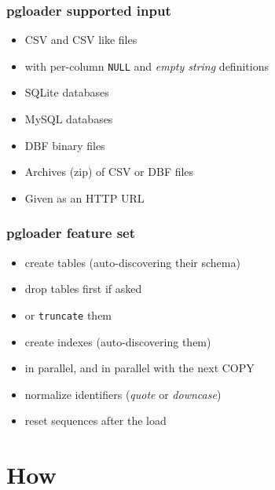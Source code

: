 \documentclass{beamer}
\begin{document}
\begin{frame}[fragile]
  \frametitle{pgloader supported input}
  
  \vfill

  \begin{itemize}
  \item CSV and CSV like files
  \item with per-column \texttt{NULL} and \textit{empty string} definitions
  \item SQLite databases
  \item MySQL databases
  \item DBF binary files
  \item Archives (zip) of CSV or DBF files
  \item Given as an HTTP URL
  \end{itemize}  
\end{frame}

\begin{frame}[fragile]
  \frametitle{pgloader feature set}
  
  \vfill

  \begin{itemize}
  \item create tables (auto-discovering their schema)
  \item drop tables first if asked
  \item or \texttt{truncate} them
  \item create indexes (auto-discovering them)
  \item in parallel, and in parallel with the next COPY
  \item normalize identifiers (\textit{quote} or \textit{downcase})
  \item reset sequences after the load
  \end{itemize}  
\end{frame}

\section{How}
\end{document}
